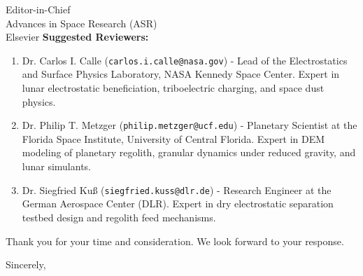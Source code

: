 \documentclass[11pt]{letter}
\begin{document}
\begin{letter}{
    Editor-in-Chief \\
    Advances in Space Research (ASR) \\
    Elsevier
}
\vspace{1em}
\textbf{Suggested Reviewers:}
\begin{enumerate}
    \item Dr. Carlos I. Calle (\texttt{carlos.i.calle@nasa.gov}) - Lead of the Electrostatics and Surface Physics Laboratory, NASA Kennedy Space Center. Expert in lunar electrostatic beneficiation, triboelectric charging, and space dust physics.
    \item Dr. Philip T. Metzger (\texttt{philip.metzger@ucf.edu}) - Planetary Scientist at the Florida Space Institute, University of Central Florida. Expert in DEM modeling of planetary regolith, granular dynamics under reduced gravity, and lunar simulants.
    \item Dr. Siegfried Ku{\ss} (\texttt{siegfried.kuss@dlr.de}) - Research Engineer at the German Aerospace Center (DLR). Expert in dry electrostatic separation testbed design and regolith feed mechanisms.
\end{enumerate}

Thank you for your time and consideration. We look forward to your response.

\closing{Sincerely,}

\end{letter}
\end{document}
